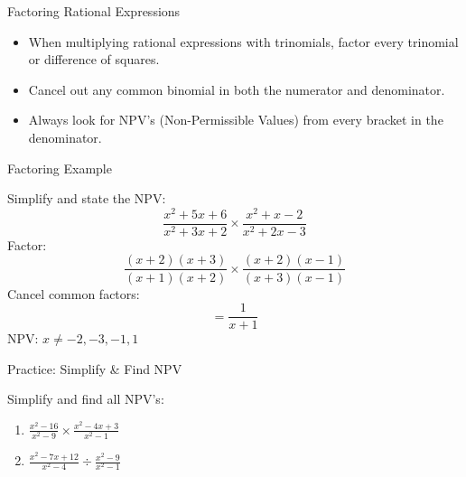 \documentclass[aspectratio=169]{beamer}
\begin{document}
\begin{frame}{Factoring Rational Expressions}
\begin{tcolorbox}[colback=lightgray,colframe=primary,title=Key Concepts]
\footnotesize
\begin{itemize}
  \item When multiplying rational expressions with trinomials, factor every trinomial or difference of squares.
  \item Cancel out any common binomial in both the numerator and denominator.
  \item Always look for NPV's (Non-Permissible Values) from every bracket in the denominator.
\end{itemize}
\end{tcolorbox}
\end{frame}

\begin{frame}{Factoring Example}
\begin{tcolorbox}[colback=lightgray,colframe=secondary,title=Example]
\footnotesize
Simplify and state the NPV:
\[
\frac{x^2 + 5x + 6}{x^2 + 3x + 2} \times \frac{x^2 + x - 2}{x^2 + 2x - 3}
\]
Factor:
\[
\frac{(x+2)(x+3)}{(x+1)(x+2)} \times \frac{(x+2)(x-1)}{(x+3)(x-1)}
\]
Cancel common factors:
\[
= \frac{1}{x+1}
\]
NPV: $x \neq -2, -3, -1, 1$
\end{tcolorbox}
\end{frame}

\begin{frame}{Practice: Simplify & Find NPV}
\begin{tcolorbox}[colback=lightgray,colframe=primary,title=Practice]
\footnotesize
Simplify and find all NPV's:
\begin{enumerate}
  \item $\frac{x^2 - 16}{x^2 - 9} \times \frac{x^2 - 4x + 3}{x^2 - 1}$
  \item $\frac{x^2 - 7x + 12}{x^2 - 4} \div \frac{x^2 - 9}{x^2 - 1}$
\end{enumerate}
\end{tcolorbox}
\end{frame}
\end{document}
